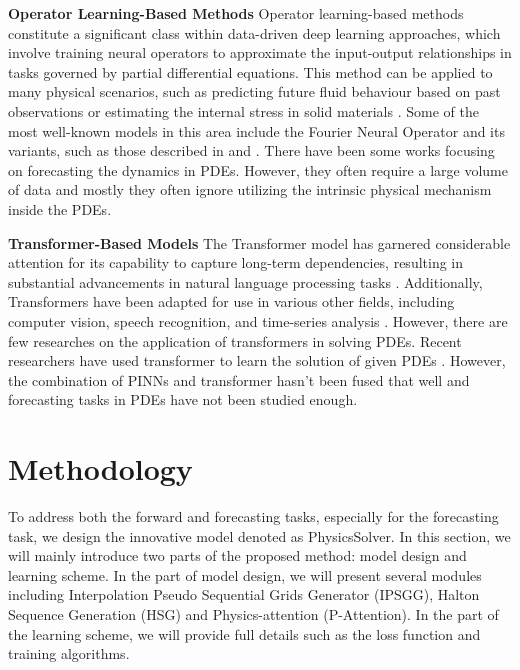 \documentclass[preprint,11pt]{elsarticle}
\begin{document}
\textbf{Operator Learning-Based Methods} 
Operator learning-based methods constitute a significant class within data-driven deep learning approaches, which involve training neural operators to approximate the input-output relationships in tasks governed by partial differential equations. This method can be applied to many physical scenarios, such as predicting future fluid behaviour based on past observations or estimating the internal stress in solid materials \cite{lu2021learning}. Some of the most well-known models in this area include the Fourier Neural Operator \cite{li2020fourier} and its variants, such as those described in  \cite{li2024geometry} and \cite{rahman2022u}. There have been some works \cite{yin2022continuous} focusing on forecasting the dynamics in PDEs. However, they often require a large volume of data and mostly they often ignore utilizing the intrinsic physical mechanism inside the PDEs.

\textbf{Transformer-Based Models}
The Transformer model \cite{vaswani2017attention} has garnered considerable attention for its capability to capture long-term dependencies, resulting in substantial advancements in natural language processing tasks \cite{kalyan2021ammus}. Additionally, Transformers have been adapted for use in various other fields, including computer vision, speech recognition, and time-series analysis \cite{dong2018speech, han2022survey,wen2022transformers}. However, there are few researches on the application of transformers in solving PDEs. Recent researchers have used transformer to learn the solution of given PDEs \cite{cao2021choose, wu2024transolver,zhao2023pinnsformer}. However, the combination of PINNs and transformer hasn't been fused that well and forecasting tasks in PDEs have not been studied enough.

\section{Methodology}
\label{sec: methodology}
To address both the forward and forecasting tasks, especially for the forecasting task, we design the innovative model denoted as PhysicsSolver. In this section, we will mainly introduce two parts of the proposed method: model design and learning scheme. In the part of model design, we will present several modules including Interpolation Pseudo Sequential Grids Generator (IPSGG), Halton Sequence Generation (HSG) and Physics-attention (P-Attention). In the part of the learning scheme, we will provide full details such as the loss function and training algorithms.
\end{document}
